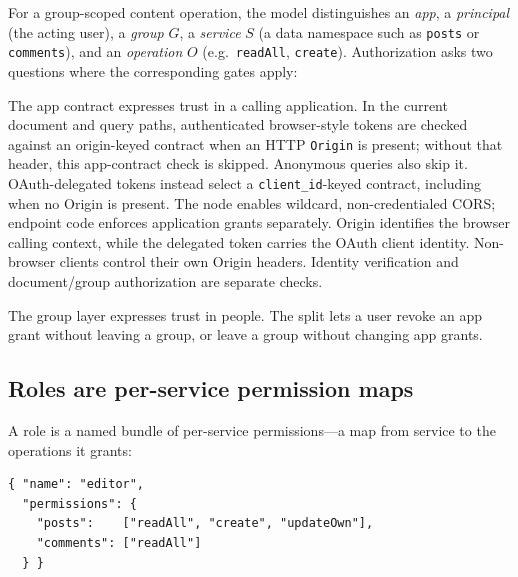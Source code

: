 \documentclass[sigconf, nonacm]{acmart}
\begin{document}
For a group-scoped content operation, the model distinguishes an \emph{app}, a
\emph{principal} (the acting user), a \emph{group} $G$, a \emph{service} $S$
(a data namespace such as \texttt{posts} or \texttt{comments}), and an
\emph{operation} $O$ (e.g.\ \texttt{readAll}, \texttt{create}). Authorization
asks two questions where the corresponding gates apply:

\begin{center}
\small
{}
\end{center}

The app contract expresses trust in a calling application. In the current
document and query paths, authenticated browser-style tokens are checked against
an origin-keyed contract when an HTTP \texttt{Origin} is present; without that
header, this app-contract check is skipped. Anonymous queries also skip it.
OAuth-delegated tokens instead select a \texttt{client\_id}-keyed contract,
including when no Origin is present. The node enables wildcard, non-credentialed
CORS; endpoint code enforces application grants separately. Origin identifies
the browser calling context, while the delegated token carries the OAuth client
identity. Non-browser clients control their own Origin headers. Identity
verification and document/group authorization are separate checks.

The group layer expresses trust in people. The split lets a user revoke an
app grant without leaving a group, or leave a group without changing app
grants.

\subsection{Roles are per-service permission maps}

A role is a named bundle of per-service permissions---a map from service to
the operations it grants:

\begin{lstlisting}[style=json]
{ "name": "editor",
  "permissions": {
    "posts":    ["readAll", "create", "updateOwn"],
    "comments": ["readAll"]
  } }
\end{lstlisting}
\end{document}
